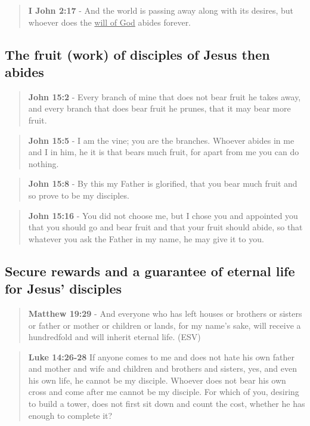 \documentclass[11pt]{article}
\begin{document}
\begin{quote}
\textbf{I John 2:17} - And the world is passing away along with its desires, but whoever does the \uline{will of God} abides forever.
\end{quote}

\subsection{The fruit (work) of disciples of Jesus then abides}
\label{sec:orgd573901}
\begin{quote}
\textbf{John 15:2} - Every branch of mine that does not bear fruit he takes away, and every branch that does bear fruit he prunes, that it may bear more fruit.
\end{quote}

\begin{quote}
\textbf{John 15:5} - I am the vine; you are the branches. Whoever abides in me and I in him, he it is that bears much fruit, for apart from me you can do nothing.
\end{quote}

\begin{quote}
\textbf{John 15:8} - By this my Father is glorified, that you bear much fruit and so prove to be my disciples.
\end{quote}

\begin{quote}
\textbf{John 15:16} - You did not choose me, but I chose you and appointed you that you should go and bear fruit and that your fruit should abide, so that whatever you ask the Father in my name, he may give it to you.
\end{quote}

\subsection{Secure rewards and a guarantee of eternal life for Jesus' disciples}
\label{sec:orgc9a45a3}

\begin{quote}
\textbf{Matthew 19:29} - And everyone who has left houses or brothers or sisters or father or mother or children or lands, for my name's sake, will receive a hundredfold and will inherit eternal life. (ESV)
\end{quote}

\begin{quote}
\textbf{Luke 14:26-28} If anyone comes to me and does not hate his own father and mother and wife and children and brothers and sisters, yes, and even his own life, he cannot be my disciple. Whoever does not bear his own cross and come after me cannot be my disciple. For which of you, desiring to build a tower, does not first sit down and count the cost, whether he has enough to complete it?
\end{quote}
\end{document}
